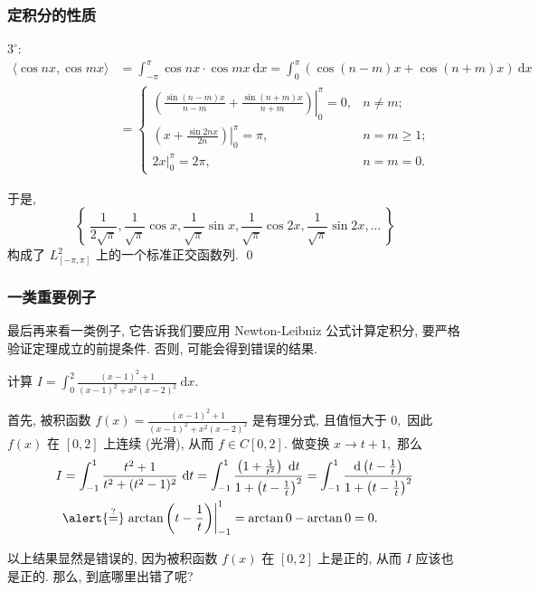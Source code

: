 
\begin{frame}
\frametitle{定积分的性质}

$3^\circ$:
\begin{align*}
\langle \cos nx, \cos mx \rangle & = \int_{-\pi}^\pi \cos nx \cdot \cos mx ~ \mathrm{d}x = \int_0^\pi (\cos (n-m)x + \cos (n+m)x) ~ \mathrm{d}x \\
& = \begin{cases} \left. \left(\frac{\sin (n-m)x}{n-m} + \frac{\sin (n+m)x}{n+m} \right) \right|_0^\pi = 0, & n \neq m; \\ \left. \left( x + \frac{\sin 2nx}{2n} \right) \right|_0^\pi = \pi, & n = m \geqslant 1; \\ 2x |_{0}^{\pi} = 2\pi, & n = m = 0. \end{cases}
\end{align*}

于是,
\[
\left\{ ~ \frac{1}{2\sqrt{\pi}}, \frac{1}{\sqrt{\pi}} \cos x, \frac{1}{\sqrt{\pi}} \sin x, \frac{1}{\sqrt{\pi}} \cos 2x, \frac{1}{\sqrt{\pi}} \sin 2x, \dots ~ \right\}
\]
构成了 $L_{[-\pi, \pi]}^2$ 上的一个标准正交函数列.
\qed

\end{frame}


\begin{frame}
\frametitle{一类重要例子}

最后再来看一类例子, 它告诉我们要应用 Newton-Leibniz 公式计算定积分, 要严格验证定理成立的前提条件. 否则, 可能会得到错误的结果.

\begin{eg}
计算 $I = \int_0^2 \frac{(x - 1)^2 + 1}{(x - 1)^2 + x^2(x - 2)^2} ~ \mathrm{d}x$.
\end{eg}

\pause

首先, 被积函数 $f(x) = \frac{(x - 1)^2 + 1}{(x - 1)^2 + x^2(x - 2)^2}$ 是有理分式, 且值恒大于 $0,$ 因此 $f(x)$ 在 $[0, 2]$ 上连续 (光滑), 从而 $f \in C[0, 2]$. 做变换 $x \to t + 1,$ 那么
\begin{align*}
I & = \int_{-1}^1 \frac{t^2 + 1}{t^2 + (t^2-1)^2} ~ \mathrm{d}t = \int_{-1}^1 \frac{\left( 1 + \frac{1}{t^2} \right) ~ \mathrm{d}t}{1 + \left( t - \frac{1}{t} \right)^2} = \int_{-1}^1 \frac{\mathrm{d} \left( t - \frac{1}{t} \right)}{1 + \left( t - \frac{1}{t} \right)^2} \\
& \alert{\overset{?}{=}} \left. \arctan \left( t - \frac{1}{t} \right) \right|_{-1}^1 = \arctan 0 - \arctan 0 = 0.
\end{align*}

\pause

以上结果显然是错误的, 因为被积函数 $f(x)$ 在 $[0, 2]$ 上是正的, 从而 $I$ 应该也是正的. 那么, 到底哪里出错了呢?

\end{frame}

